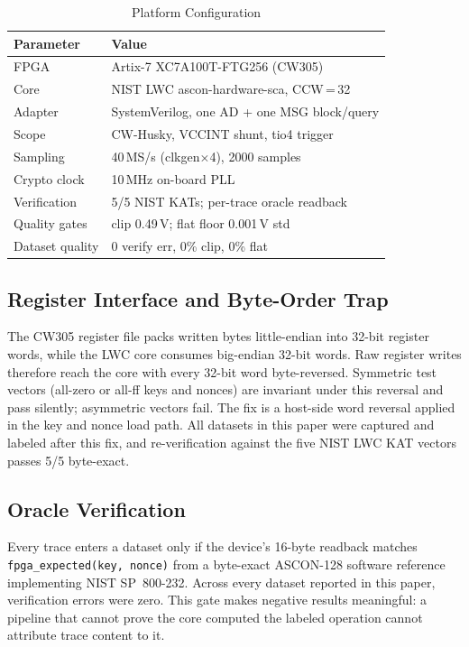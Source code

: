 \documentclass[conference]{IEEEtran}
\begin{document}
\begin{table}[htbp]
  \caption{Platform Configuration}
  \label{tab:platform}
  \centering
  \begin{tabular}{ll}
    \toprule
    \textbf{Parameter} & \textbf{Value} \\
    \midrule
    FPGA        & Artix-7 XC7A100T-FTG256 (CW305) \\
    Core        & NIST LWC ascon-hardware-sca, CCW\,=\,32 \\
    Adapter     & SystemVerilog, one AD + one MSG block/query \\
    Scope       & CW-Husky, VCCINT shunt, tio4 trigger \\
    Sampling    & 40\,MS/s (clkgen$\times$4), 2000 samples \\
    Crypto clock & 10\,MHz on-board PLL \\
    Verification & 5/5 NIST KATs; per-trace oracle readback \\
    Quality gates & clip 0.49\,V; flat floor 0.001\,V std \\
    Dataset quality & 0 verify err, 0\% clip, 0\% flat \\
    \bottomrule
  \end{tabular}
\end{table}

\subsection{Register Interface and Byte-Order Trap}

The CW305 register file packs written bytes little-endian into
32-bit register words, while the LWC core consumes big-endian
32-bit words. Raw register writes therefore reach the core with
every 32-bit word byte-reversed. Symmetric test vectors
(all-zero or all-ff keys and nonces) are invariant under this
reversal and pass silently; asymmetric vectors fail. The fix is
a host-side word reversal applied in the key and nonce load
path. All datasets in this paper were captured and labeled
after this fix, and re-verification against the five NIST LWC
KAT vectors passes 5/5 byte-exact.

\subsection{Oracle Verification}

Every trace enters a dataset only if the device's 16-byte
readback matches \texttt{fpga\_expected(key,\,nonce)} from a
byte-exact ASCON-128 software reference implementing NIST
SP~800-232. Across every dataset reported in this paper,
verification errors were zero. This gate makes negative results
meaningful: a pipeline that cannot prove the core computed the
labeled operation cannot attribute trace content to it.
\end{document}

